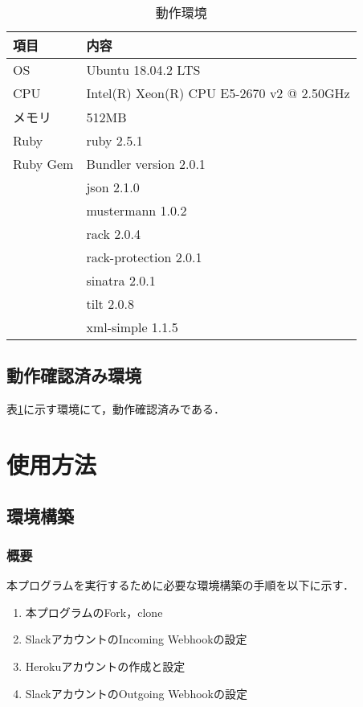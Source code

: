 \documentclass[12pt]{jsarticle}
\begin{document}
\begin{table}[htb]
  \begin{center}
    \caption{動作環境}\label{tab:env}
    \begin{tabular}{l|l}
      \hline\hline
      \multicolumn{1}{l|}{項目} & \multicolumn{1}{l}{内容}\\
      \hline
      OS & Ubuntu 18.04.2 LTS\\
      CPU & Intel(R) Xeon(R) CPU E5-2670 v2 @ 2.50GHz\\
      メモリ &512MB\\
      Ruby &ruby 2.5.1\\
      Ruby Gem & Bundler version 2.0.1\\
      & json 2.1.0\\
      & mustermann 1.0.2\\
      & rack 2.0.4\\
      & rack-protection 2.0.1\\
      & sinatra 2.0.1\\
      & tilt 2.0.8\\
      & xml-simple 1.1.5\\
      \hline
    \end{tabular}
  \end{center}
\end{table}

\subsection{動作確認済み環境}
表\ref{tab:env}に示す環境にて，動作確認済みである．

\section{使用方法}

\subsection{環境構築}

\subsubsection{概要}
本プログラムを実行するために必要な環境構築の手順を以下に示す．

\begin{enumerate}
\item 本プログラムのFork，clone
\item SlackアカウントのIncoming Webhookの設定
\item Herokuアカウントの作成と設定
\item SlackアカウントのOutgoing Webhookの設定
\end{enumerate}
\end{document}
